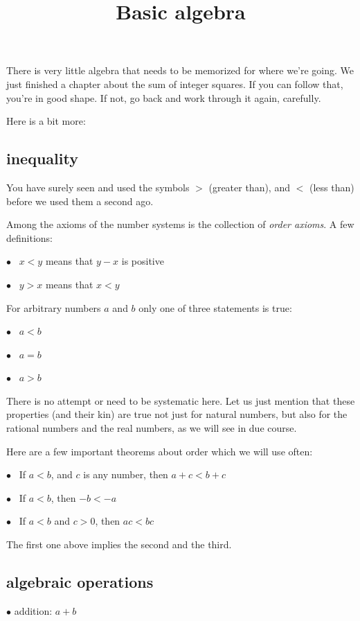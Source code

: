 \documentclass[11pt, oneside]{article}
\title{Basic algebra}
\date{}
\begin{document}
\maketitle
\Large


There is very little algebra that needs to be memorized for where we're going.  We just finished a chapter about the sum of integer squares.  If you can follow that, you're in good shape.  If not, go back and work through it again, carefully.

Here is a bit more:

\subsection*{inequality}
You have surely seen and used the symbols $>$ (greater than), and $<$ (less than) before we used them a second ago.

Among the axioms of the number systems is the collection of \emph{order axioms}.  A few definitions:

$\bullet$ \ $x < y$ means that $y - x$ is positive

$\bullet$ \ $y > x$ means that $x < y$

For arbitrary numbers $a$ and $b$ only one of three statements is true:  

$\bullet$ \ $a < b$

$\bullet$ \ $a = b$

$\bullet$ \ $a > b$

There is no attempt or need to be systematic here.  Let us just mention that these properties (and their kin) are true not just for natural numbers, but also for the rational numbers and the real numbers, as we will see in due course.  

Here are a few important theorems about order which we will use often:

$\bullet$ \ If $a < b$, and $c$ is any number, then $a + c < b + c$

$\bullet$ \ If $a < b$, then $-b < -a$

$\bullet$ \ If $a < b$ and $c > 0$, then $ac < bc$

The first one above implies the second and the third.

\subsection*{algebraic operations}

$\bullet$ addition:  $a + b$
\end{document}
